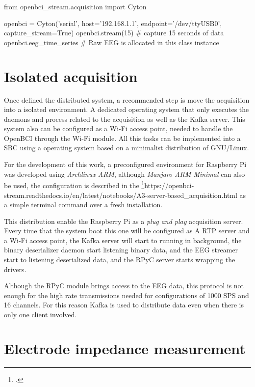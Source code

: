 \begin{python}
from openbci_stream.acquisition import Cyton

openbci = Cyton('serial', host='192.168.1.1', endpoint='/dev/ttyUSB0', capture_stream=True)
openbci.stream(15)  # capture 15 seconds of data
openbci.eeg_time_series # Raw EEG is allocated in this class instance
\end{python}

\section{Isolated acquisition}\label{chap3:isolated-acquisition}

Once defined the distributed system, a recommended step is move the acquisition into a isolated environment. A dedicated operating system that only executes the daemons and process related to the acquisition as well as the Kafka server. This system also can be configured as a Wi-Fi access point, needed to handle the OpenBCI through the Wi-Fi module. All this tasks can be implemented into a \gls*{SBC} using a operating system based on a minimalist distribution of GNU/Linux.

For the development of this work, a preconfigured environment for Raspberry Pi was developed using \textit{Archlinux ARM}, although \textit{Manjaro ARM Minimal} can also be used, the configuration is described in the \footcite{documentation}{https://openbci-stream.readthedocs.io/en/latest/notebooks/A3-server-based\_acquisition.html} as a simple terminal command over a fresh installation.

This distribution enable the Raspberry Pi as a \textit{plug and play} acquisition server. Every time that the system boot this one will be configured as A \gls{RTP} server and a Wi-Fi access point, the Kafka server will start to running in background, the binary deserializer daemon start listening binary data, and the EEG streamer start to listening  deserialized data, and the RPyC server starts wrapping the drivers.

Although the \gls*{RPyC} module brings access to the EEG data, this protocol is not enough for the high rate transmissions needed for configurations of 1000 \gls*{SPS} and 16 channels. For this reason Kafka is used to distribute data even when there is only one client involved.

\section{Electrode impedance measurement}\label{subsec:impedance-measurement}

